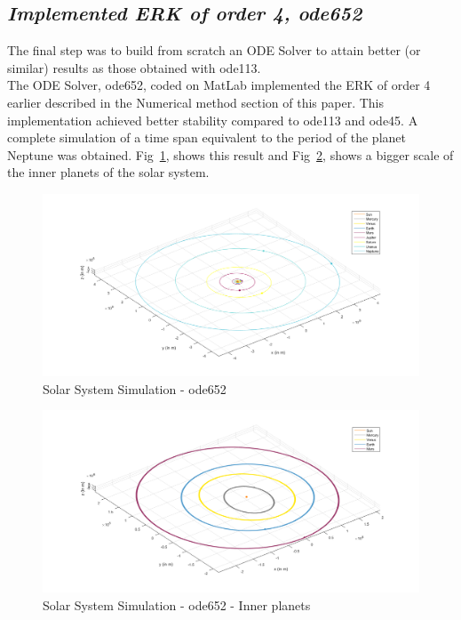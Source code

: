 \documentclass[a4paper]{article}
\begin{document}
\subsection{\textit{Implemented ERK of order 4, ode652}}
The final step was to build from scratch an ODE Solver to attain better (or similar) results as those obtained with  ode113.\\

The ODE Solver, ode652, coded on MatLab implemented the ERK of order 4 earlier described in the Numerical method section of this paper. This implementation achieved better stability compared to ode113 and ode45. A complete simulation of a time span equivalent to the period of the planet Neptune was obtained. Fig~\ref{fig:Solar_System_-_ode652}, shows this result and Fig~\ref{fig:Solar_System_-_ode652_-_ipsim}, shows a bigger scale of the inner planets of the solar system.

\begin{figure}[H]
\centering
\includegraphics[width=1\textwidth]{Solar_System_-_ode652.png}
\caption{Solar System Simulation - ode652}
\label{fig:Solar_System_-_ode652}
\end{figure}

\begin{figure}[H]
\centering
\includegraphics[width=1\textwidth]{Solar_System_-_ode652_-_ipsim.png}
\caption{Solar System Simulation - ode652 - Inner planets }
\label{fig:Solar_System_-_ode652_-_ipsim}
\end{figure}
\end{document}

